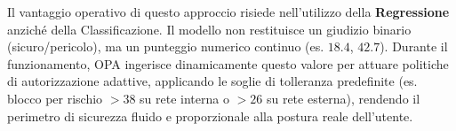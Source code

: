 Il vantaggio operativo di questo approccio risiede nell'utilizzo della \textbf{Regressione} anziché della Classificazione. Il modello non restituisce un giudizio binario (sicuro/pericolo), ma un punteggio numerico continuo (es. $18.4$, $42.7$). Durante il funzionamento, OPA ingerisce dinamicamente questo valore per attuare politiche di autorizzazione adattive, applicando le soglie di tolleranza predefinite (es. blocco per rischio $> 38$ su rete interna o $> 26$ su rete esterna), rendendo il perimetro di sicurezza fluido e proporzionale alla postura reale dell'utente.